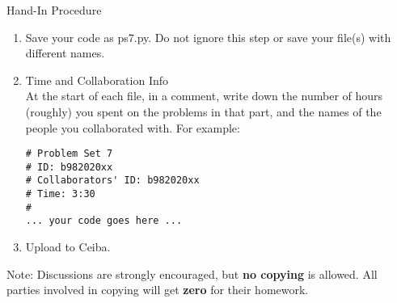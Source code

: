 \documentclass[12pt]{article}
\begin{document}
Hand-In Procedure  
\begin{enumerate}
\item Save your code as ps7.py.
 Do not ignore this step or save your file(s) with different names. 
\item Time and Collaboration Info \\
At the start of each file, in a comment, write down the number of hours (roughly) you spent on 
the problems in that part, and the names of the people you collaborated with. For example:
\begin{verbatim}
# Problem Set 7
# ID: b982020xx
# Collaborators' ID: b982020xx
# Time: 3:30
# 
... your code goes here ...
\end{verbatim}
\item Upload to Ceiba.
\end{enumerate}
Note: Discussions are strongly encouraged, but \textbf{no copying} is allowed. All parties involved in copying will get \textbf{zero} for their homework. 
\end{document}
